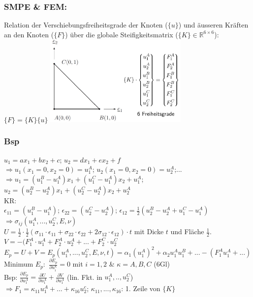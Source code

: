 \documentclass[a4paper,10pt]{article}
\begin{document}
\begin{multicols*}{3}
        \subsubsection{SMPE \& FEM:}
            Relation der Verschiebungsfreiheitsgrade der Knoten ($\{u\}$) und äusseren Kräften an den Knoten ($\{F\}$) über die globale Steifigkeitsmatrix ($\{K\}\in\mathbb{R}^{6\times6}$): $\{F\}=\{K\}\{u\}$
            \includegraphics[width=70mm]{Dreieckselement}
        \subsubsection{Bsp}
            $u_1=ax_1+bx_2+c$; $u_2=dx_1+ex_2+f$\\
            $\Rightarrow u_1(x_1=0,x_2=0)=u_1^A$; $u_2(x_1=0,x_2=0)=u_2^A$;...\\
            $\Rightarrow u_1=(u_1^B-u_1^A)x_1+(u_1^C-u_1^A)x_2+u_1^A$;\\
            $u_2=(u_2^B-u_2^A)x_1+(u_2^C-u_2^A)x_2+u_2^A$\\
            KR:\\
            $\epsilon_{11}=(u_1^B-u_1^A)$; $\epsilon_{22}=(u_2^C-u_2^A)$; $\epsilon_{12}=\frac{1}{2}(u_2^B-u_2^A+u_1^C-u_1^A)$
            $\Rightarrow\sigma_{ij}(u_1^A,...,u_2^C,E,\nu)$\\
            $U=\frac{1}{2}\cdot\frac{1}{2}(\sigma_{11}\cdot\epsilon_{11}+\sigma_{22}\cdot\epsilon_{22}+2\sigma_{12}\cdot\epsilon_{12})\cdot t$ mit Dicke $t$ und Fläche $\frac{1}{2}$.\\
            $V=-(F_1^A\cdot u_1^A+F_2^A\cdot u_2^A+...+F_2^C\cdot u_2^C$\\
            $E_p=U+V=E_p(u_1^A,...,u_2^C,E,\nu,t)=\alpha_1(u_1^A)^2+\alpha_2u_1^Au_1^B+ ...-(F_1^Au_1^A+...)$\\
            Minimum $E_p:$ $\frac{\partial E_p}{\partial u_i^\kappa}=0$ mit $i=1,2$ \& $\kappa=A,B,C$ (6Gl)\\
            Bsp: $\frac{\partial E_p}{\partial u_1^A}=\frac{\partial U}{\partial u_1^A}+\frac{\partial V}{\partial u_1^A}$ (lin. Fkt. in $u_1^A,..,u_2^C$) \\$\Rightarrow F_1=\kappa_{11}u_1^A+...+\kappa_{16}u_2^c$; $\kappa_{11},...,\kappa_{16}$: 1. Zeile von $\{K\}$


\end{multicols*}
\end{document}
